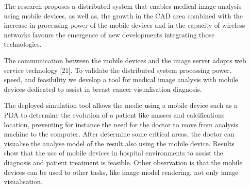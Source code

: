 The research proposes a distributed system that enables medical image analysis using mobile devices, as well as, the growth in the CAD area combined with the increase in processing power of the mobile devices and in the capacity of wireless networks favours the emergence of new developments integrating those technologies.

The communication between the mobile devices and the image server adopts web service technology [21]. To validate the distributed system processing power, speed, and feasibility we develop a tool for medical image analysis with mobile devices dedicated to assist in breast cancer visualisation diagnosis.

The deployed simulation tool allows the medic using a mobile device such as a PDA to determine the evolution of a patient like masses and calcifications location, preventing for instance the need for the doctor to move from analysis machine to the computer. After determine some critical areas, the doctor can visualise the analyse model of the result also using the mobile device. Results show that the use of mobile devices in hospital environments to assist the diagnosis and patient treatment is feasible. Other observation is that the mobile devices can be used to other tasks, like image model rendering, not only image visualisation.